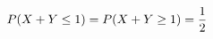 \documentclass[preview]{standalone}
\begin{document}
\begin{align*}
\special{dvisvgm:raw <g id='unique000'>}P(X+Y\le 1)=P(X+Y\ge 1)=\dfrac{1}{2}\special{dvisvgm:raw </g>}
\end{align*}
\end{document}
